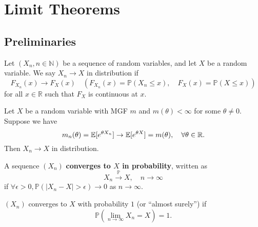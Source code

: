 \section{Limit Theorems}
\subsection{Preliminaries}
\begin{definition}
    Let $(X_n,n\in\mathbb N)$ be a sequence of random variables, and let $X$ be a random variable. We say $X_n\to X$ in distribution if
    $$F_{X_n}(x)\to F_X(x)\quad (F_{X_n}(x)=\mathbb P(X_n\le x),\quad F_X(x)=\mathbb P(X\le x))$$
    for all $x\in\mathbb R$ such that $F_X$ is continuous at $x$.
\end{definition}

\begin{theorem}
    Let $X$ be a random variable with MGF $m$ and $m(\theta)<\infty$ for some $\theta\neq 0$.
    Suppose we have
    $$m_n(\theta)=\mathbb E[e^{\theta X_n}]\to {\mathbb{E}}[e^{\theta X}] = m(\theta),\quad\forall\theta\in\mathbb R.$$
    Then $X_n\to X$ in distribution.
\end{theorem}

\begin{definition}
    A sequence $(X_n)$ \textbf{converges to $X$ in probability}, written as
    $$X_n\xrightarrow{\mathbb P}X,\quad n \to\infty$$
    if $\forall\epsilon>0,\mathbb P(|X_n-X|>\epsilon)\to 0$ as $n\to\infty$.
\end{definition}

\begin{definition}
    $(X_n)$ converges to $X$ with probability $1$ (or ``almost surely'') if
    $$\mathbb P\left(\lim_{n\to\infty}X_n=X\right)=1.$$
\end{definition}


